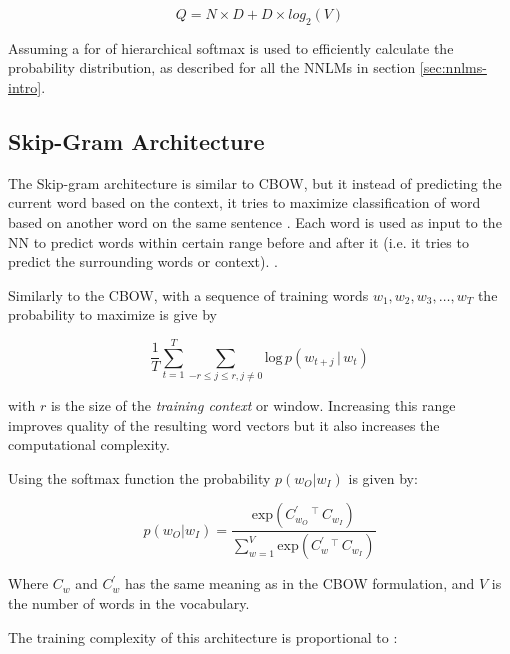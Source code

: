 \begin{equation}
  Q = N \times D + D \times  log_2(V)
\end{equation}

Assuming a for of hierarchical softmax is used to efficiently calculate the
probability distribution, as described for all the \ac{NNLM}s in section \ref{sec:nnlms-intro}.


\subsection{Skip-Gram Architecture}
\label{sec:skip-gram-architecture}

The Skip-gram architecture is similar to \ac{CBOW}, but it instead of
predicting the current word based on the context, it tries to maximize
classification of word based on another word on the same sentence
\cite{DBLP:journals/corr/abs-1301-3781}.  Each  word is used as input
to the \ac{NN} to predict words within certain range before and after 
it (i.e. it tries to predict the surrounding words or context). 
\cite{DBLP:journals/corr/abs-1301-3781}. 

Similarly to the \ac{CBOW}, with a sequence of training words $w_1,w_2,w_3,
\dots, w_T$ the probability to maximize is give by


 \begin{equation}
  \label{eq:sumprob-cbow}
   \frac{1}{T} \sum^{T}_{t=1}{\sum_{-r \leq j \leq r, j \neq 0}\text{log} \, p
     \left( w_{t+j} \, |\, w_t  \right)}
\end{equation}

with $r$ is the size of the \textit{training context} or window.  Increasing
this range improves quality of the resulting word vectors but it also
increases the computational complexity.

Using the softmax function the probability  $p(w_O|w_I)$ is given by:

\begin{equation}
  \label{eq:logp-skgram}
  p(w_O|w_I) = \frac{\text{exp}\left(C^{'}_{w_O}\,^\top\,C_{w_I} \right)
  }{\sum^{V}_{w=1} \text{exp} \left( C^{'}_w \,^\top\, C_{w_I} \right)   }  
\end{equation}


Where $C_w$ and $C^{'}_w$  has the same meaning as in the \ac{CBOW} formulation,  and $V$ is the number of
words in the vocabulary.

The training complexity of this architecture is proportional to
\cite{DBLP:journals/corr/abs-1301-3781}:

